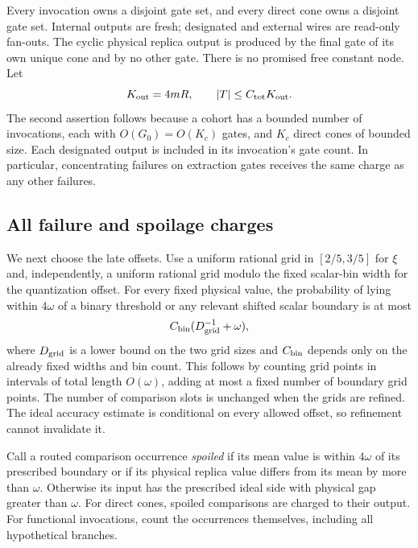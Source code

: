 Every invocation owns a disjoint gate set, and every direct cone owns a
disjoint gate set. Internal outputs are fresh; designated and external
wires are read-only fan-outs. The cyclic physical replica output is
produced by the final gate of its own unique cone and by no other gate.
There is no promised free constant node. Let
\begin{equation}\label{out:gate-count}
 K_{\rm out}=4mR,
 \qquad |T|\leq C_{\rm tot}K_{\rm out}.
\end{equation}
The second assertion follows because a cohort has a bounded number of
invocations, each with $O(G_0)=O(K_c)$ gates, and $K_c$ direct cones of
bounded size. Each designated output is included in its invocation's
gate count. In particular, concentrating failures on extraction gates
receives the same charge as any other failures.

\subsection{All failure and spoilage charges}

We next choose the late offsets. Use a uniform rational grid in
$[2/5,3/5]$ for $\xi$ and, independently, a uniform rational grid modulo
the fixed scalar-bin width for the quantization offset. For every fixed
physical value, the probability of lying within $4\omega$ of a binary
threshold or any relevant shifted scalar boundary is at most
\begin{equation}\label{out:anticoncentration}
 C_{\rm bin}(D_{\rm grid}^{-1}+\omega),
\end{equation}
where $D_{\rm grid}$ is a lower bound on the two grid sizes and
$C_{\rm bin}$ depends only on the already fixed widths and bin count.
This follows by counting grid points in intervals of total length
$O(\omega)$, adding at most a fixed number of boundary grid points.
The number of comparison slots is unchanged when the grids are refined.
The ideal accuracy estimate is conditional on every allowed offset, so
refinement cannot invalidate it.

Call a routed comparison occurrence \emph{spoiled} if its mean value is
within $4\omega$ of its prescribed boundary or if its physical replica
value differs from its mean by more than $\omega$. Otherwise its input
has the prescribed ideal side with physical gap greater than $\omega$.
For direct cones, spoiled comparisons are charged to their output. For
functional invocations, count the occurrences themselves, including
all hypothetical branches.

